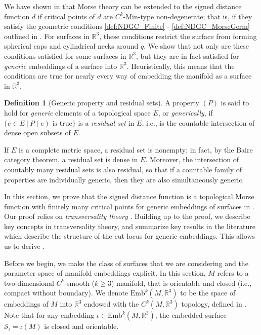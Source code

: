 \documentclass[11pt]{article}
\newcommand{\R}{\mathbb{R}}
\newcommand{\Emb}{\mathrm{Emb}^k(M,\R^3)}
\newcommand{\Surf}{\mathcal{S}}
\theoremstyle{plain}
\theoremstyle{definition}
\newtheorem{defi}{Definition}
\theoremstyle{remark}
\begin{document}
	We have shown in  that Morse theory can be extended to the signed distance function $d$ if critical points of $d$ are $C^k$-Min-type non-degenerate; that is, if they satisfy the  geometric conditions \ref{def:NDGC_Finite} - \ref{def:NDGC_MorseGerm} outlined in . 
	For surfaces in $\R^3$, these conditions restrict the surface from forming spherical caps and cylindrical necks around $q$. 
	We show that not only are these conditions satisfied for some surfaces in $\R^3$, but they are in fact satisfied for \textit{generic} embeddings of a surface into $\R^3$. 
	Heuristically, this means that the conditions are true for nearly every way of embedding the manifold as a surface in $\R^3$. 
	
	\begin{defi}[Generic property and residual sets]
		A property $(P)$ is said to hold for \emph{generic} elements of a topological space $E$, or \emph{generically}, if 
		$\{e \in E ~|~ P(e) \text{ is true} \}$
		is a \emph{residual set} in $E$, i.e.,
		is the countable intersection of dense open subsets of $E$.
	\end{defi}
	
	If $E$ is a complete metric space, a residual set is nonempty; in fact, by the Baire category theorem, a residual set is dense in $E$. Moreover, the intersection of countably many residual sets is also residual, so that if a countable family of properties are individually generic, then they are also simultaneously generic.
	
	In this section, we prove that the signed distance function is a topological Morse function with finitely many critical points for generic embeddings of surfaces in . Our proof relies on \emph{transversality theory} \citep{guillemin_differential_2010}. Building up to the proof, we describe key concepts in transversality theory, and summarize key results in the literature which describe the structure of the cut locus for generic embeddings. This allows us to derive .
	
	
	Before we begin, we make the class of surfaces that we are considering and the parameter space of manifold embeddings explicit. In this section, $M$ refers to a two-dimensional $C^k$-smooth ($k \geq 3$) manifold, that is orientable and closed (i.e., compact without boundary).
	We denote $\Emb$ to be the space of embeddings of $M$ into $\R^3$ endowed with the $C^k(M,\R^3)$ topology, defined in \cite{hirsch_differential_1976}. Note that for any embedding $\iota \in \Emb$, the embedded surface $\Surf_\iota = \iota(M)$ is closed and orientable. 
	
\end{document}
